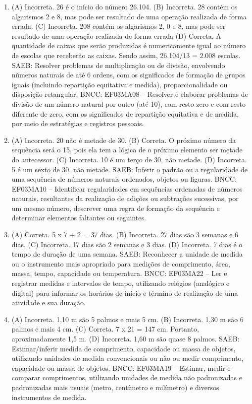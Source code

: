 \begin{enumerate}
\item
(A) Incorreta. 26 é o início do número 26.104.
(B) Incorreta. 28 contém os algarismos 2 e 8, mas pode ser resultado de uma operação realizada de forma errada.
(C) Incorreta. 208 contém os algarismos 2, 0 e 8, mas pode ser resultado de uma operação realizada de forma errada
(D) Correta. A quantidade de caixas que serão produzidas é numericamente igual ao número de
escolas que receberão as caixas. Sendo assim, 26.104/13 = 2.008 escolas.
SAEB: Resolver problemas de multiplicação ou de divisão, envolvendo números naturais de até 6 ordens, com os significados de formação de grupos iguais (incluindo repartição equitativa e medida), proporcionalidade ou disposição retangular.
BNCC: EF03MA08 -- Resolver e elaborar problemas de divisão de um número natural por outro (até
10), com resto zero e com resto diferente de zero, com os significados de repartição equitativa
e de medida, por meio de estratégias e registros pessoais.

\item
(A) Incorreta. 20 não é metade de 30.
(B) Correta. O próximo número da sequência será o 15, pois ela tem a lógica de o próximo
elemento ser metade do antecessor.
(C) Incorreta. 10 é um terço de 30, não metade.
(D) Incorreta. 5 é um sexto de 30, não metade.
SAEB: Inferir o padrão ou a regularidade de uma sequência de números naturais ordenados, objetos ou figuras.
BNCC: EF03MA10 -- Identificar regularidades em sequências ordenadas de números naturais,
resultantes da realização de adições ou subtrações sucessivas, por um mesmo número,
descrever uma regra de formação da sequência e determinar elementos faltantes ou seguintes.

\item
(A) Correta. 5 x 7 + 2 = 37 dias.
(B) Incorreta. 27 dias são 3 semanas e 6 dias.
(C) Incorreta. 17 dias são 2 semanas e 3 dias.
(D) Incorreta. 7 dias é o tempo de duração de uma semana.
SAEB: Reconhecer a unidade de medida ou o instrumento mais apropriado para medições de comprimento, área, massa, tempo, capacidade
ou temperatura.
BNCC: EF03MA22 -- Ler e registrar medidas e intervalos de tempo, utilizando relógios (analógico e
digital) para informar os horários de início e término de realização de uma atividade e sua
duração.

\item
(A) Incorreta. 1,10 m são 5 palmos e mais 5 cm.
(B) Incorreta. 1,30 m são 6 palmos e mais 4 cm. 
(C) Correta. 7 x 21 = 147 cm. Portanto, aproximadamente 1,5 m.
(D) Incorreta. 1,60 m são quase 8 palmos.
SAEB: Estimar/inferir medida de comprimento, capacidade ou massa de objetos, utilizando unidades de medida convencionais ou não ou medir comprimento, capacidade ou massa de objetos.
BNCC: EF03MA19 -- Estimar, medir e comparar comprimentos, utilizando unidades de medida
não padronizadas e padronizadas mais usuais (metro, centímetro e milímetro) e diversos
instrumentos de medida.


\end{enumerate}

